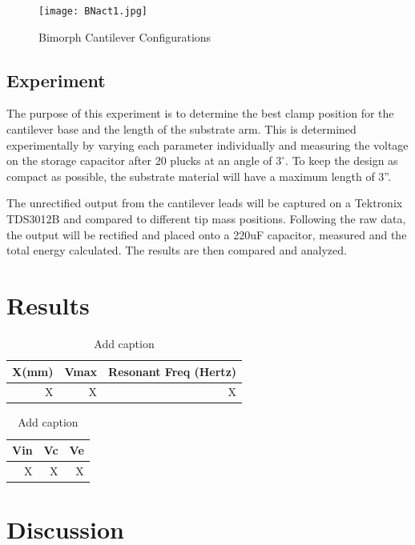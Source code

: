 \documentclass[aps,prl,twocolumn,groupedaddress]{revtex4}
\begin{document}
\begin{figure}[ht!]
  \centering
  \texttt{[image: BNact1.jpg]}
  \caption{Bimorph Cantilever Configurations}
\end{figure}

\subsection{Experiment}
  
The purpose of this experiment is to determine the best clamp position for the cantilever base and the length of the substrate arm. This is determined experimentally by varying each parameter individually and measuring the voltage on the storage capacitor after 20 plucks at an angle of $3^\circ$. To keep the design as compact as possible, the substrate material will have a maximum length of 3''. 

The unrectified output from the cantilever leads will be captured on a Tektronix TDS3012B and compared to different tip mass positions. Following the raw data, the output will be rectified and placed onto a 220uF capacitor, measured and the total energy calculated. The results are then compared and analyzed. 

\section{Results}

\begin{table}[htbp]
  \centering
  \caption{Add caption}
    \begin{tabular}{rrr}
    \toprule
    \textbf{X(mm)} & \textbf{Vmax} & \textbf{Resonant Freq (Hertz)} \\
    \midrule
    X     &  X   & X  \\

    \bottomrule
    \end{tabular}%
  \label{tab:addlabel}%
\end{table}%

\begin{table}[htbp]
  \centering
  \caption{Add caption}
    \begin{tabular}{rrr}
    \toprule
    \textbf{Vin} & \textbf{Vc} & \textbf{Ve} \\
    \midrule
    X     &  X   & X  \\

    \bottomrule
    \end{tabular}%
  \label{tab:addlabel}%
\end{table}%






\section{Discussion}

\vfill
\end{document}

